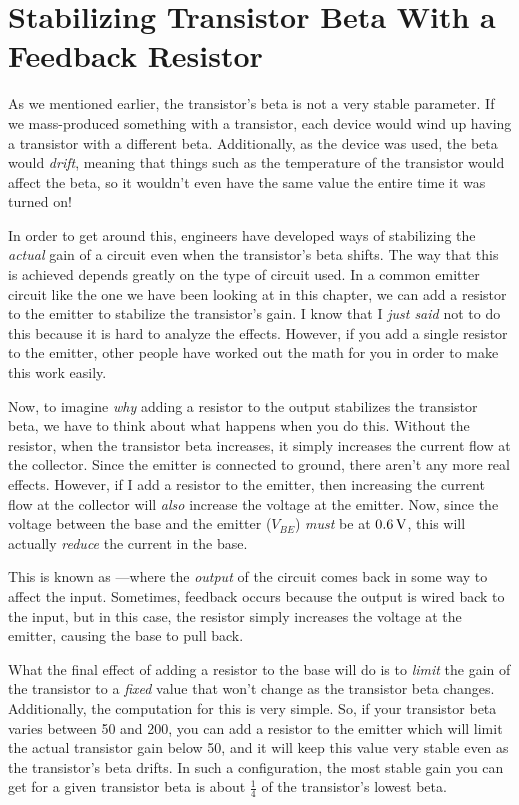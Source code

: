 \section{Stabilizing Transistor Beta With a Feedback Resistor}

As we mentioned earlier, the transistor's beta is not a very stable parameter.
If we mass-produced something with a transistor, each device would wind up having a transistor with a different beta.
Additionally, as the device was used, the beta would \emph{drift}, meaning that things such as the temperature of the transistor would affect the beta, so it wouldn't even have the same value the entire time it was turned on!

In order to get around this, engineers have developed ways of stabilizing the \emph{actual} gain of a circuit even when the transistor's beta shifts.
The way that this is achieved depends greatly on the type of circuit used.
In a common emitter circuit like the one we have been looking at in this chapter, we can add a resistor to the emitter to stabilize the transistor's gain.
I know that I \emph{just said} not to do this because it is hard to analyze the effects.
However, if you add a single resistor to the emitter, other people have worked out the math for you in order to make this work easily.

Now, to imagine \emph{why} adding a resistor to the output stabilizes the transistor beta, we have to think about what happens when you do this.
Without the resistor, when the transistor beta increases, it simply increases the current flow at the collector.  
Since the emitter is connected to ground, there aren't any more real effects.
However, if I add a resistor to the emitter, then increasing the current flow at the collector will \emph{also} increase the voltage at the emitter.
Now, since the voltage between the base and the emitter ($V_{BE}$) \emph{must} be at $0.6\,\si{\volt}$, this will actually \emph{reduce} the current in the base.

This is known as ---where the \emph{output} of the circuit comes back in some way to affect the input.
Sometimes, feedback occurs because the output is wired back to the input, but in this case, the resistor simply increases the voltage at the emitter, causing the base to pull back.

What the final effect of adding a resistor to the base will do is to \emph{limit} the gain of the transistor to a \emph{fixed} value that won't change as the transistor beta changes.
Additionally, the computation for this is very simple.
So, if your transistor beta varies between 50 and 200, you can add a resistor to the emitter which will limit the actual transistor gain below 50, and it will keep this value very stable even as the transistor's beta drifts.
In such a configuration, the most stable gain you can get for a given transistor beta is about $\frac{1}{4}$ of the transistor's lowest beta.

